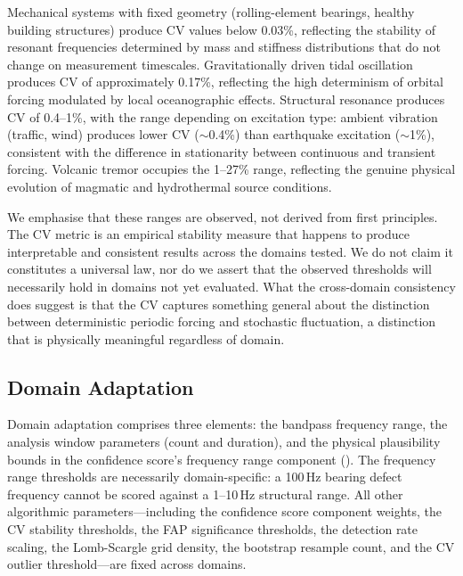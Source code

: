 \documentclass[11pt,a4paper]{article}
\begin{document}
Mechanical systems with fixed geometry (rolling-element bearings, healthy building structures) produce CV values below 0.03\%, reflecting the stability of resonant frequencies determined by mass and stiffness distributions that do not change on measurement timescales. Gravitationally driven tidal oscillation produces CV of approximately 0.17\%, reflecting the high determinism of orbital forcing modulated by local oceanographic effects. Structural resonance produces CV of 0.4--1\%, with the range depending on excitation type: ambient vibration (traffic, wind) produces lower CV (${\sim}$0.4\%) than earthquake excitation (${\sim}$1\%), consistent with the difference in stationarity between continuous and transient forcing. Volcanic tremor occupies the 1--27\% range, reflecting the genuine physical evolution of magmatic and hydrothermal source conditions.

We emphasise that these ranges are observed, not derived from first principles. The CV metric is an empirical stability measure that happens to produce interpretable and consistent results across the domains tested. We do not claim it constitutes a universal law, nor do we assert that the observed thresholds will necessarily hold in domains not yet evaluated. What the cross-domain consistency does suggest is that the CV captures something general about the distinction between deterministic periodic forcing and stochastic fluctuation, a distinction that is physically meaningful regardless of domain.

\subsection{Domain Adaptation}
\label{sec:adaptation}

Domain adaptation comprises three elements: the bandpass frequency range, the analysis window parameters (count and duration), and the physical plausibility bounds in the confidence score's frequency range component (). The frequency range thresholds are necessarily domain-specific: a 100\,Hz bearing defect frequency cannot be scored against a 1--10\,Hz structural range. All other algorithmic parameters---including the confidence score component weights, the CV stability thresholds, the FAP significance thresholds, the detection rate scaling, the Lomb-Scargle grid density, the bootstrap resample count, and the CV outlier threshold---are fixed across domains.
\end{document}
